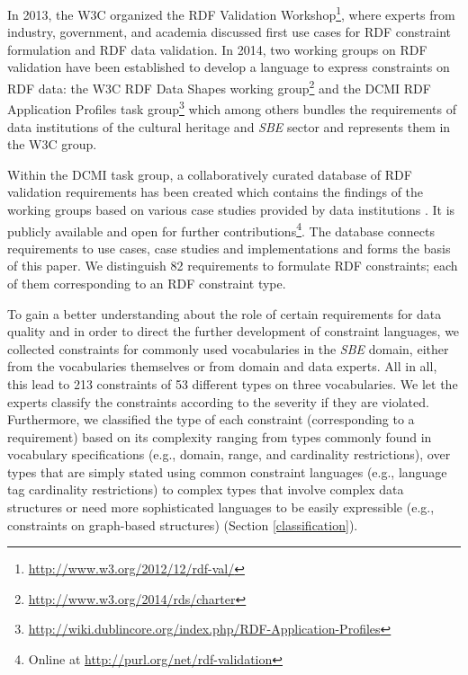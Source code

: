 \documentclass{llncs}
\begin{document}
In 2013, the W3C organized the RDF Validation Workshop\footnote{\url{http://www.w3.org/2012/12/rdf-val/}}, 
where experts from industry, government, and academia discussed first use cases for RDF constraint formulation and RDF data validation.
In 2014, two working groups on RDF validation have been established to develop a language to express constraints on RDF data: 
the W3C RDF Data Shapes working group\footnote{\url{http://www.w3.org/2014/rds/charter}} and the DCMI RDF Application Profiles task group\footnote{\url{http://wiki.dublincore.org/index.php/RDF-Application-Profiles}} which among others bundles the requirements of data institutions of the cultural heritage and \emph{SBE} sector and represents them in the W3C group. 

Within the DCMI task group, a collaboratively curated database of RDF validation requirements has been created which contains the findings of the working groups based on various case studies provided by data institutions \cite{BoschEckert2014}. It is publicly available and open for further contributions\footnote{Online at \url{http://purl.org/net/rdf-validation}}.
The database connects requirements to use cases, case studies and implementations and forms the basis of this paper. 
We distinguish 82 requirements to formulate RDF constraints; 
each of them corresponding to an RDF constraint type.

To gain a better understanding about the role of certain requirements for data quality and in order to direct the further development of constraint languages, we collected constraints for commonly used vocabularies in the \emph{SBE} domain, either from the vocabularies themselves or from domain and data experts. All in all, this lead to 213 constraints of 53 different types on three vocabularies. 
We let the experts classify the constraints according to the severity if they are violated. Furthermore, we classified the type of each constraint (corresponding to a requirement) based on its complexity ranging from types commonly found in vocabulary specifications (e.g., domain, range, and cardinality restrictions), 
over types that are simply stated using common constraint languages (e.g., language tag cardinality restrictions) to complex types that involve complex data structures or need more sophisticated languages to be easily expressible 
(e.g., constraints on graph-based structures) (Section \ref{classification}).
\end{document}
